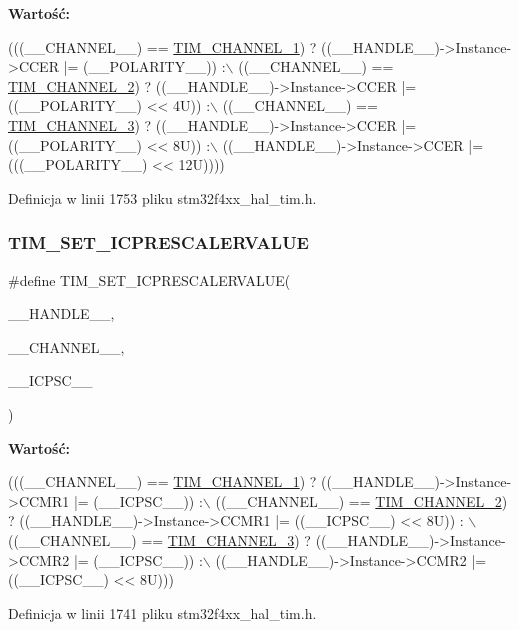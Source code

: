 {\bfseries Wartość\+:}
\begin{DoxyCode}
(((\_\_CHANNEL\_\_) == \hyperlink{group___t_i_m___channel_ga6b1541e4a49d62610899e24bf23f4879}{TIM\_CHANNEL\_1}) ? ((\_\_HANDLE\_\_)->Instance->CCER |= (\_\_POLARITY\_\_)) :\(\backslash\)
   ((\_\_CHANNEL\_\_) == \hyperlink{group___t_i_m___channel_ga33e02d43345a7ac5886f01b39e4f7ccd}{TIM\_CHANNEL\_2}) ? ((\_\_HANDLE\_\_)->Instance->CCER |= ((\_\_POLARITY\_\_) << 4U))
       :\(\backslash\)
   ((\_\_CHANNEL\_\_) == \hyperlink{group___t_i_m___channel_ga4ea100c1789b178f3cb46721b7257e2d}{TIM\_CHANNEL\_3}) ? ((\_\_HANDLE\_\_)->Instance->CCER |= ((\_\_POLARITY\_\_) << 8U))
       :\(\backslash\)
   ((\_\_HANDLE\_\_)->Instance->CCER |= (((\_\_POLARITY\_\_) << 12U))))
\end{DoxyCode}


Definicja w linii 1753 pliku stm32f4xx\+\_\+hal\+\_\+tim.\+h.

\mbox{\label{group___t_i_m___private___macros_ga99724157918ca8b4d8babee1d8008dcb}} 
\subsubsection{\texorpdfstring{T\+I\+M\+\_\+\+S\+E\+T\+\_\+\+I\+C\+P\+R\+E\+S\+C\+A\+L\+E\+R\+V\+A\+L\+UE}{TIM\_SET\_ICPRESCALERVALUE}}
{\footnotesize\ttfamily \#define T\+I\+M\+\_\+\+S\+E\+T\+\_\+\+I\+C\+P\+R\+E\+S\+C\+A\+L\+E\+R\+V\+A\+L\+UE(\begin{DoxyParamCaption}\item[{}]{\+\_\+\+\_\+\+H\+A\+N\+D\+L\+E\+\_\+\+\_\+,  }\item[{}]{\+\_\+\+\_\+\+C\+H\+A\+N\+N\+E\+L\+\_\+\+\_\+,  }\item[{}]{\+\_\+\+\_\+\+I\+C\+P\+S\+C\+\_\+\+\_\+ }\end{DoxyParamCaption})}

{\bfseries Wartość\+:}
\begin{DoxyCode}
(((\_\_CHANNEL\_\_) == \hyperlink{group___t_i_m___channel_ga6b1541e4a49d62610899e24bf23f4879}{TIM\_CHANNEL\_1}) ? ((\_\_HANDLE\_\_)->Instance->CCMR1 |= (\_\_ICPSC\_\_)) :\(\backslash\)
   ((\_\_CHANNEL\_\_) == \hyperlink{group___t_i_m___channel_ga33e02d43345a7ac5886f01b39e4f7ccd}{TIM\_CHANNEL\_2}) ? ((\_\_HANDLE\_\_)->Instance->CCMR1 |= ((\_\_ICPSC\_\_) << 8U)) :
      \(\backslash\)
   ((\_\_CHANNEL\_\_) == \hyperlink{group___t_i_m___channel_ga4ea100c1789b178f3cb46721b7257e2d}{TIM\_CHANNEL\_3}) ? ((\_\_HANDLE\_\_)->Instance->CCMR2 |= (\_\_ICPSC\_\_)) :\(\backslash\)
   ((\_\_HANDLE\_\_)->Instance->CCMR2 |= ((\_\_ICPSC\_\_) << 8U)))
\end{DoxyCode}


Definicja w linii 1741 pliku stm32f4xx\+\_\+hal\+\_\+tim.\+h.

